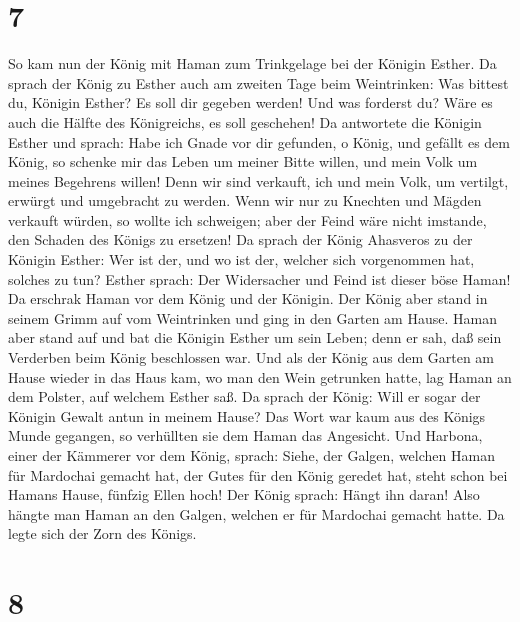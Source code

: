 \hypertarget{section-6}{%
\section{7}\label{section-6}}

 So kam nun der König mit Haman zum Trinkgelage bei der
Königin Esther.  Da sprach der König zu Esther auch am
zweiten Tage beim Weintrinken: Was bittest du, Königin Esther? Es soll
dir gegeben werden! Und was forderst du? Wäre es auch die Hälfte des
Königreichs, es soll geschehen!  Da antwortete die Königin
Esther und sprach: Habe ich Gnade vor dir gefunden, o König, und gefällt
es dem König, so schenke mir das Leben um meiner Bitte willen, und mein
Volk um meines Begehrens willen!  Denn wir sind verkauft,
ich und mein Volk, um vertilgt, erwürgt und umgebracht zu werden. Wenn
wir nur zu Knechten und Mägden verkauft würden, so wollte ich schweigen;
aber der Feind wäre nicht imstande, den Schaden des Königs zu ersetzen!
 Da sprach der König Ahasveros zu der Königin Esther: Wer
ist der, und wo ist der, welcher sich vorgenommen hat, solches zu tun?
 Esther sprach: Der Widersacher und Feind ist dieser böse
Haman! Da erschrak Haman vor dem König und der Königin. 
Der König aber stand in seinem Grimm auf vom Weintrinken und ging in den
Garten am Hause. Haman aber stand auf und bat die Königin Esther um sein
Leben; denn er sah, daß sein Verderben beim König beschlossen war.
 Und als der König aus dem Garten am Hause wieder in das
Haus kam, wo man den Wein getrunken hatte, lag Haman an dem Polster, auf
welchem Esther saß. Da sprach der König: Will er sogar der Königin
Gewalt antun in meinem Hause? Das Wort war kaum aus des Königs Munde
gegangen, so verhüllten sie dem Haman das Angesicht.  Und
Harbona, einer der Kämmerer vor dem König, sprach: Siehe, der Galgen,
welchen Haman für Mardochai gemacht hat, der Gutes für den König geredet
hat, steht schon bei Hamans Hause, fünfzig Ellen hoch! Der König sprach:
Hängt ihn daran!  Also hängte man Haman an den Galgen,
welchen er für Mardochai gemacht hatte. Da legte sich der Zorn des
Königs.

\hypertarget{section-7}{%
\section{8}\label{section-7}}

